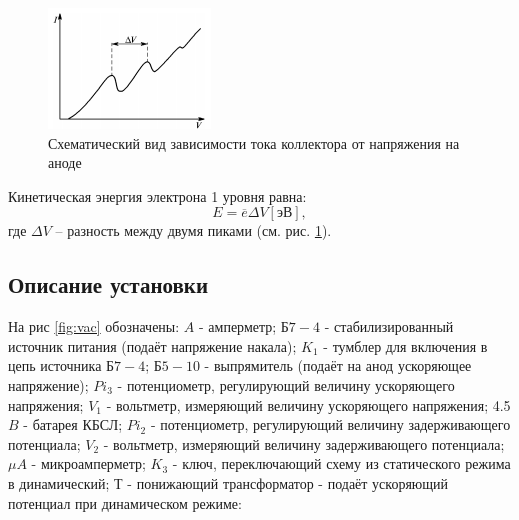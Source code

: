 \documentclass[a4paper, 12pt]{article}%
\begin{document}
\begin{figure}[!h]
\begin{center}
\begin{minipage}[h]{0.45\linewidth}
\includegraphics[width=1\linewidth]{fig2.PNG}
\caption{Схематический вид зависимости тока коллектора от напряжения на аноде}
\label{ris:experimcoded}
\end{minipage}
\end{center}
\end{figure}

Кинетическая энергия электрона 1 уровня равна:
\begin{equation}\label{key}
	E = \overline{e} \Delta V \left[\text{эВ}\right],
\end{equation}
где $ \Delta V $ -- разность между двумя пиками (см. рис. \ref{ris:experimcoded}).

\subsection{Описание установки}

На рис \ref{fig:vac} обозначены:
$A$ - амперметр; $\text{Б}7-4$ - стабилизированный источник питания (подаёт напряжение накала); $K_1$ - тумблер для включения в цепь источника $\text{Б}7-4$; $\text{Б}5-10$ - выпрямитель (подаёт на анод ускоряющее напряжение); $Pi_3$ - потенциометр, регулирующий величину ускоряющего напряжения; $V_1$ - вольтметр, измеряющий величину ускоряющего напряжения; 4.5 $B$ - батарея КБСЛ; $Pi_2$ - потенциометр, регулирующий величину задерживающего потенциала; $V_2$ - вольтметр, измеряющий величину задерживающего потенциала; $\mu A$ - микроамперметр; $K_3$ - ключ, переключающий схему из статического режима в динамический; Т - понижающий трансформатор - подаёт ускоряющий потенциал при динамическом режиме: 
\end{document}
